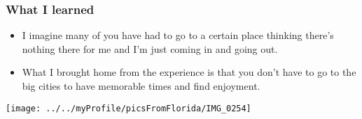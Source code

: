 


\begin{frame} 
\frametitle{What I learned}
\begin{itemize} 
\item I imagine many of you have had to go to a certain place thinking there's nothing there for me and I'm just coming in and going out. 
\item What I brought home from the experience is that you don't have
  to go to the big cities to have memorable times and find enjoyment.
\end{itemize}

\end{frame}



\begin{frame}[plain,c]
\begin{center}
\texttt{[image: ../../myProfile/picsFromFlorida/IMG\_0254]}
\end{center} 
\end{frame}
